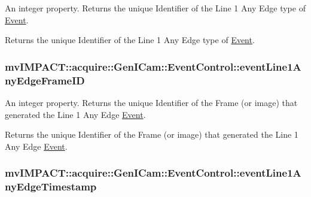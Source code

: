 An integer property. Returns the unique Identifier of the Line 1 Any Edge type of \hyperlink{classmv_i_m_p_a_c_t_1_1acquire_1_1_event}{Event}. 

Returns the unique Identifier of the Line 1 Any Edge type of \hyperlink{classmv_i_m_p_a_c_t_1_1acquire_1_1_event}{Event}. \hypertarget{classmv_i_m_p_a_c_t_1_1acquire_1_1_gen_i_cam_1_1_event_control_a58b2f335c89fe2fee4095f73374b6a98}{
\subsubsection[{event\+Line1\+Any\+Edge\+Frame\+I\+D}]{ mv\+I\+M\+P\+A\+C\+T\+::acquire\+::\+Gen\+I\+Cam\+::\+Event\+Control\+::event\+Line1\+Any\+Edge\+Frame\+I\+D}}\label{classmv_i_m_p_a_c_t_1_1acquire_1_1_gen_i_cam_1_1_event_control_a58b2f335c89fe2fee4095f73374b6a98}


An integer property. Returns the unique Identifier of the Frame (or image) that generated the Line 1 Any Edge \hyperlink{classmv_i_m_p_a_c_t_1_1acquire_1_1_event}{Event}. 

Returns the unique Identifier of the Frame (or image) that generated the Line 1 Any Edge \hyperlink{classmv_i_m_p_a_c_t_1_1acquire_1_1_event}{Event}. \hypertarget{classmv_i_m_p_a_c_t_1_1acquire_1_1_gen_i_cam_1_1_event_control_af7e100fbb973becc95b2f8b6fbb865a8}{
\subsubsection[{event\+Line1\+Any\+Edge\+Timestamp}]{ mv\+I\+M\+P\+A\+C\+T\+::acquire\+::\+Gen\+I\+Cam\+::\+Event\+Control\+::event\+Line1\+Any\+Edge\+Timestamp}}\label{classmv_i_m_p_a_c_t_1_1acquire_1_1_gen_i_cam_1_1_event_control_af7e100fbb973becc95b2f8b6fbb865a8}


